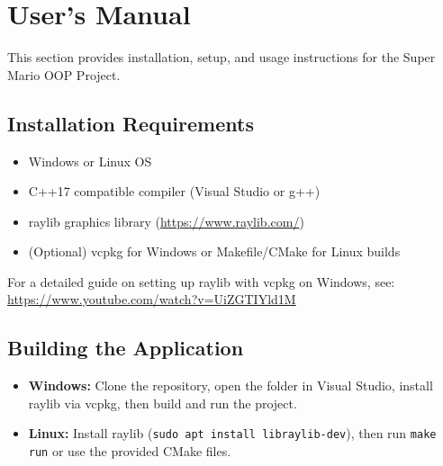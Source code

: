 \clearpage
\section{User's Manual}
\label{sec:manual}

This section provides installation, setup, and usage instructions for the Super Mario OOP Project.

\subsection{Installation Requirements}
\begin{itemize}
    \item Windows or Linux OS
    \item C++17 compatible compiler (Visual Studio or g++)
    \item raylib graphics library (\url{https://www.raylib.com/})
    \item (Optional) vcpkg for Windows or Makefile/CMake for Linux builds
\end{itemize}

For a detailed guide on setting up raylib with vcpkg on Windows, see:  
\url{https://www.youtube.com/watch?v=UiZGTIYld1M}

\subsection{Building the Application}
\begin{itemize}
    \item \textbf{Windows:} Clone the repository, open the folder in Visual Studio, install raylib via vcpkg, then build and run the project.
    \item \textbf{Linux:} Install raylib (\texttt{sudo apt install libraylib-dev}), then run \texttt{make run} or use the provided CMake files.
\end{itemize}

